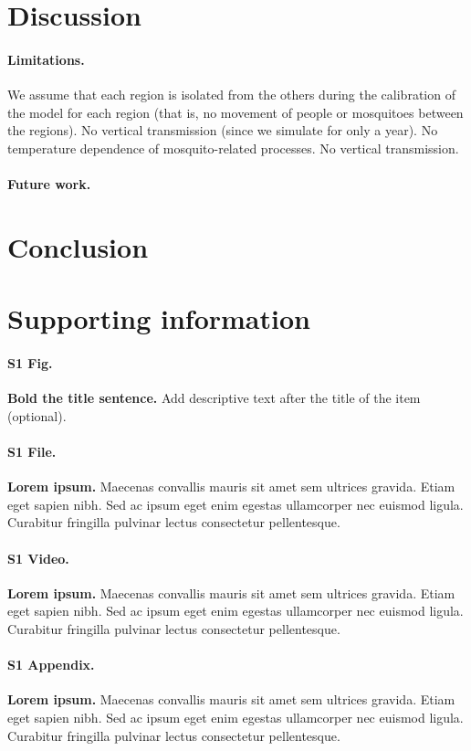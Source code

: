 \documentclass[10pt,letterpaper]{article}
\begin{document}
\section*{Discussion}
\paragraph{Limitations.} We assume that each region is isolated from the others during the calibration of the model for each region (that is, no movement of people or mosquitoes between the regions). No vertical transmission (since we simulate for only a year). No temperature dependence of mosquito-related processes. No vertical transmission.
\paragraph{Future work.} 

\section*{Conclusion}

\section*{Supporting information}

\paragraph*{S1 Fig.}
\label{S1_Fig}
{\bf Bold the title sentence.} Add descriptive text after the title of the item (optional).
\paragraph*{S1 File.}
\label{S1_File}
{\bf Lorem ipsum.}  Maecenas convallis mauris sit amet sem ultrices gravida. Etiam eget sapien nibh. Sed ac ipsum eget enim egestas ullamcorper nec euismod ligula. Curabitur fringilla pulvinar lectus consectetur pellentesque.

\paragraph*{S1 Video.}
\label{S1_Video}
{\bf Lorem ipsum.}  Maecenas convallis mauris sit amet sem ultrices gravida. Etiam eget sapien nibh. Sed ac ipsum eget enim egestas ullamcorper nec euismod ligula. Curabitur fringilla pulvinar lectus consectetur pellentesque.

\paragraph*{S1 Appendix.}
\label{S1_Appendix}
{\bf Lorem ipsum.} Maecenas convallis mauris sit amet sem ultrices gravida. Etiam eget sapien nibh. Sed ac ipsum eget enim egestas ullamcorper nec euismod ligula. Curabitur fringilla pulvinar lectus consectetur pellentesque.
\end{document}
